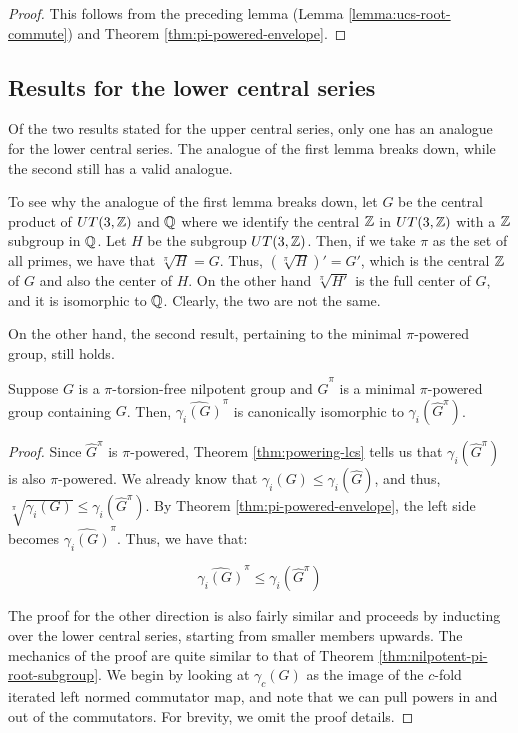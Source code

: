 \begin{proof}
  This follows from the preceding lemma (Lemma
  \ref{lemma:ucs-root-commute}) and Theorem
  \ref{thm:pi-powered-envelope}.
\end{proof}

\subsection{Results for the lower central series}

Of the two results stated for the upper central series, only one has
an analogue for the lower central series. The analogue of the first lemma
breaks down, while the second still has a valid analogue.

To see why the analogue of the first lemma breaks down, let $G$ be the
central product of $UT(3,\mathbb{Z})$ and $\mathbb{Q}$ where we identify the central
$\mathbb{Z}$ in $UT(3,\mathbb{Z})$ with a $\mathbb{Z}$ subgroup in $\mathbb{Q}$. Let $H$ be the
subgroup $UT(3,\mathbb{Z})$. Then, if we take $\pi$ as the set of all primes,
we have that $\sqrt[\pi]{H} = G$. Thus, $(\sqrt[\pi]{H})' = G'$, which
is the central $\mathbb{Z}$ of $G$ and also the center of $H$. On the other
hand $\sqrt[\pi]{H'}$ is the full center of $G$, and it is isomorphic
to $\mathbb{Q}$. Clearly, the two are not the same.

On the other hand, the second result, pertaining to the minimal
$\pi$-powered group, still holds.

\begin{lemma}\label{lemma:lcs-pi-envelope}
  Suppose $G$ is a $\pi$-torsion-free nilpotent group and $\hat{G}^\pi$ is
  a minimal $\pi$-powered group containing $G$. Then,
  $\hat{\gamma_i(G)}^\pi$ is canonically isomorphic to
  $\gamma_i(\hat{G}^\pi)$.
\end{lemma}

\begin{proof}
  Since $\hat{G}^\pi$ is $\pi$-powered, Theorem \ref{thm:powering-lcs} tells
  us that $\gamma_i(\hat{G}^\pi)$ is also $\pi$-powered. We already
  know that $\gamma_i(G) \le \gamma_i(\hat{G})$, and thus,
  $\sqrt[\pi]{\gamma_i(G)} \le \gamma_i(\hat{G}^{\pi})$. By Theorem
  \ref{thm:pi-powered-envelope}, the left side becomes
  $\hat{\gamma_i(G)}^\pi$. Thus, we have that:

  $$\hat{\gamma_i(G)}^\pi \le \gamma_i(\hat{G}^{\pi})$$

  The proof for the other direction is also fairly similar and
  proceeds by inducting over the lower central series, starting from
  smaller members upwards. The mechanics of the proof are quite similar
  to that of Theorem \ref{thm:nilpotent-pi-root-subgroup}. We begin by
  looking at $\gamma_c(G)$ as the image of the $c$-fold iterated left
  normed commutator map, and note that we can pull powers in and out
  of the commutators. For brevity, we omit the proof details. %
\end{proof}

